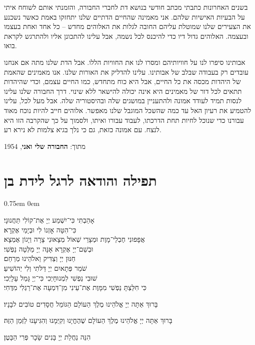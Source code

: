 \documentclass[14pt, article, extrafontsizes, twopage, a4paper]{memoir}
\newcommand{\attr}[1]{
  {\raggedright\smaller#1


  }
}
\begin{document}
בשנים האחרונות כתבתי מכתב חודשי בנושא דת לחברי החבורה, והזמנתי אותם לשוחח איתי על הבעיות האישיות שלהם. אני מאמינה שהחיים הדתיים שלנו יתחזקו באמת כאשר נשכנע את הצעירים שלנו שמוטלת עליהם החובה לגלות את האלוהים מחדש – כל אחד ואחת בעצמו ובעצמה. האלוהים גדול דיו כדי להיכנס לכל נשמה, אבל עלינו להתכונן אליו ולהתרגש לקראת בואו.

אבותינו סיפרו לנו על חוויותיהם ומסרו לנו את החוויות הללו. אבל הדת שלנו מתה אם אנחנו עובדים רק בעבודה שבלב של אבותינו. עלינו להדליק את האורות שלנו. אנו מאמינים שהאמת של היהדות מכסה את כל החיים, אבל היא כוח מתחדש, כמו החיים עצמם, וכדי שהיהדות תתאים לכל דור של מאמינים היא אינה יכולה להישאר ללא שינוי. דרך החבורה שלנו עלינו לנסות תמיד לעודד אמונה ולהתעניין במושגים שלה ובהיסטוריה שלה. אבל מעל לכל, עלינו להטמיע את רעיון האל עד כמה שהשכל המוגבל שלנו מאפשר. אלוהים חייב להיות נוכח מאוד עבורנו כדי שנוכל לחיות תחת הדרכתו, לעבוד עבורו ואיתו, ולסמוך על כך שהקרבה הזו היא לנצח. עם אמונה כזאת, גם כי נלך בגיא צלמות לא נירא רע.

\attr{מתוך: \textbf{החבורה שלי ואני}, 1954}


\pagebreak
\chapter{תפילה והודאה לרגל לידת בן}
\parskip 0.75em
\parindent 0em


אָהַבְתִּי כִּי־יִשְׁמַע יְיָ אֶת־קוֹלִי תַּחֲנוּנָי׃\\
כִּי־הִטָּה אׇזְנוֹ לִי וּבְיָמַי אֶקְרָא׃\\
אֲפָפוּנִי חֶבְלֵי־מָוֶת וּמְצָרֵי שְׁאוֹל מְצָאוּנִי צָרָה וְיָגוֹן אֶמְצָא׃\\
וּבְשֵׁם־יְיָ אֶקְרָא אָנָּה יְיָ מַלְּטָה נַפְשִׁי׃\\
חַנּוּן יְיָ וְצַדִּיק וֵאלֹהֵינוּ מְרַחֵם׃\\
שֹׁמֵר פְּתָאיִם יְיָ דַּלֹּתִי וְלִי יְהוֹשִׁיעַ׃\\
שׁוּבִי נַפְשִׁי לִמְנוּחָיְכִי כִּי־יְיָ גָּמַל עָלָיְכִי׃\\
כִּי חִלַּצְתָּ נַפְשִׁי מִמָּוֶת אֶת־עֵינִי מִן־דִּמְעָה אֶת־רַגְלִי מִדֶּחִי׃

בָּרוּךְ אַתָּה יְיָ אֱלֹהֵינוּ מֶלֶךְ הַעוֹלָם הַגּוֹמֵל חֲסָדִים טוֹבִים לבָנָיו׃

בָּרוּךְ אַתָּה יְיָ אֱלֹהֵינוּ מֶלֶךְ הַעוֹלָם שֶׁהֶחֱיָנוּ וְקִיְּמָנוּ וְהִגִּיעָנוּ לַזְּמַן הַזֶּה׃

הִנֵּה נַחֲלַת יְיָ בָּנִים שָׂכָר פְּרִי הַבָּטֶן׃
\end{document}
